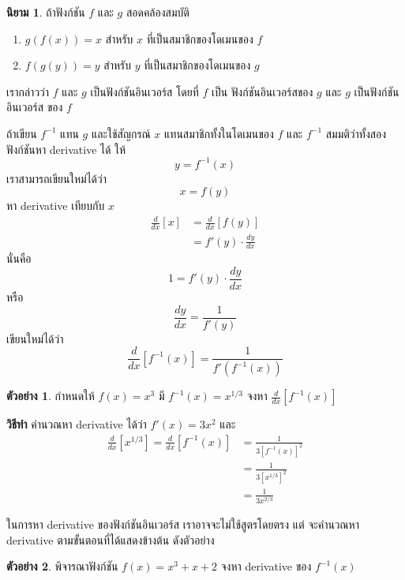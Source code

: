 \documentclass[
]{book}
\theoremstyle{definition}
\newtheorem{definition}{นิยาม}[chapter]
\theoremstyle{definition}
\newtheorem{example}{ตัวอย่าง}[chapter]
\theoremstyle{definition}
\theoremstyle{definition}
\theoremstyle{remark}
\begin{document}
\begin{definition}
ถ้าฟังก์ชัน \(f\) และ \(g\) สอดคล้องสมบัติ

\begin{enumerate}
\def\labelenumi{\arabic{enumi}.}
\item
  \(g(f(x)) = x\) สำหรับ \(x\) ที่เป็นสมาชิกของโดเมนของ \(f\)
\item
  \(f(g(y)) = y\) สำหรับ \(y\) ที่เป็นสมาชิกของโดเมนของ \(g\)
\end{enumerate}

เรากล่าวว่า \(f\) และ \(g\) เป็นฟังก์ชันอินเวอร์ส โดยที่ \(f\) เป็น ฟังก์ชันอินเวอร์สของ \(g\)
และ \(g\) เป็นฟังก์ชันอินเวอร์ส ของ \(f\)
\end{definition}

ถ้าเขียน \(f^{-1}\) แทน \(g\) และใช้สัญกรณ์ \(x\) แทนสมาชิกทั้งในโดเมนของ \(f\) และ
\(f^{-1}\) สมมติว่าทั้งสองฟังก์ชันหา derivative ได้ ให้ \[y = f^{-1}(x)\]
เราสามารถเขียนใหม่ได้ว่า \[x = f(y)\] หา derivative เทียบกับ \(x\)
\begin{equation}   \begin{aligned}
    \frac{d}{dx}[x]
    &= \frac{d}{dx}[f(y)] \\
    &= f'(y) \cdot \frac{dy}{dx}
  \end{aligned} \end{equation} นั่นคือ \[1 = f'(y) \cdot \frac{dy}{dx}\]
หรือ \[\frac{dy}{dx} = \frac{1}{f'(y)}\] เขียนใหม่ได้ว่า \[\label{E:inverse}
\boxed{
    \frac{d}{dx}[f^{-1}(x)] = \frac{1}{f'(f^{-1}(x))}
}\]

\begin{example}
กำหนดให้ \(f(x) = x^3\) มี \(f^{-1}(x) = x^{1/3}\) จงหา
\(\frac{d}{dx} [f^{-1}(x)]\)
\end{example}

\textbf{วิธีทำ} คำนวณหา derivative ได้ว่า \(f'(x) = 3x^2\) และ
\begin{equation}   \begin{aligned}
    \frac{d}{dx} [x^{1/3}]  = \frac{d}{dx} [f^{-1}(x)]
    &= \frac{1}{3[f^{-1}(x)]^2} \\
    &= \frac{1}{3[x^{1/3}]^2} \\
    &= \frac{1}{3x^{2/3}}
  \end{aligned} \end{equation}

ในการหา derivative ของฟังก์ชันอินเวอร์ส เราอาจจะไม่ใช้สูตรโดยตรง แต่ จะคำนวณหา
derivative ตามขั้นตอนที่ได้แสดงข้างต้น ดังตัวอย่าง

\begin{example}
พิจารณาฟังก์ชัน \(f(x) = x^3+x+2\) จงหา derivative ของ \(f^{-1}(x)\)
\end{example}
\end{document}
